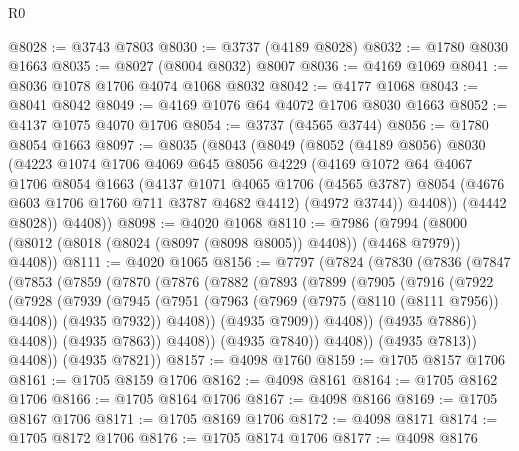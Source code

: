 \begin{lexlean}{R0}
\begin{coremodule}
@8028 := @3743 @7803
@8030 := @3737 (@4189 @8028)
@8032 := @1780 @8030 @1663
@8035 := @8027 (@8004 @8032) @8007
@8036 := @4169 @1069
@8041 := @8036 @1078 @1706 @4074 @1068 @8032
@8042 := @4177 @1068
@8043 := @8041 @8042
@8049 := @4169 @1076 @64 @4072 @1706 @8030 @1663
@8052 := @4137 @1075 @4070 @1706
@8054 := @3737 (@4565 @3744)
@8056 := @1780 @8054 @1663
@8097 := @8035
    (@8043
      (@8049
        (@8052
          (@4189 @8056)
          @8030
          (@4223
            @1074
            @1706
            @4069
            @645
            @8056
            @4229
            (@4169
              @1072
              @64
              @4067
              @1706
              @8054
              @1663
              (@4137
                @1071
                @4065
                @1706
                (@4565 @3787)
                @8054
                (@4676 @603 @1706 @1760 @711 @3787 @4682 @4412)
                (@4972 @3744))
              @4408))
          (@4442 @8028))
        @4408))
@8098 := @4020 @1068
@8110 := @7986
    (@7994 (@8000 (@8012 (@8018 (@8024 (@8097 (@8098 @8005)) @4408)) (@4468 @7979)) @4408))
@8111 := @4020 @1065
@8156 := @7797
    (@7824
      (@7830
        (@7836
          (@7847
            (@7853
              (@7859
                (@7870
                  (@7876
                    (@7882
                      (@7893
                        (@7899
                          (@7905
                            (@7916
                              (@7922
                                (@7928
                                  (@7939
                                    (@7945
                                      (@7951
                                        (@7963
                                          (@7969 (@7975 (@8110 (@8111 @7956)) @4408))
                                          (@4935 @7932))
                                        @4408))
                                    (@4935 @7909))
                                  @4408))
                              (@4935 @7886))
                            @4408))
                        (@4935 @7863))
                      @4408))
                  (@4935 @7840))
                @4408))
            (@4935 @7813))
          @4408))
      (@4935 @7821))
@8157 := @4098 @1760
@8159 := @1705 @8157 @1706
@8161 := @1705 @8159 @1706
@8162 := @4098 @8161
@8164 := @1705 @8162 @1706
@8166 := @1705 @8164 @1706
@8167 := @4098 @8166
@8169 := @1705 @8167 @1706
@8171 := @1705 @8169 @1706
@8172 := @4098 @8171
@8174 := @1705 @8172 @1706
@8176 := @1705 @8174 @1706
@8177 := @4098 @8176

\end{coremodule}
\end{lexlean}
